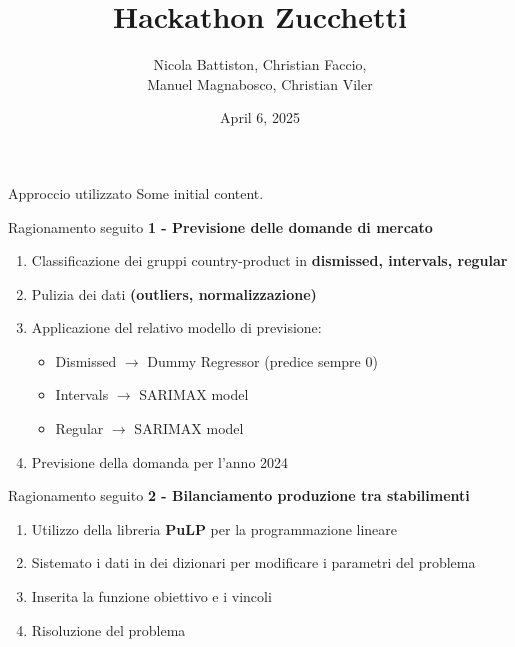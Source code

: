 \documentclass{beamer}
\title{\textbf{Hackathon Zucchetti}}
\author{Nicola Battiston, Christian Faccio, \\ Manuel Magnabosco, Christian Viler}
\date{April 6, 2025}
\begin{document}
\frame{\titlepage}

\begin{frame}{Approccio utilizzato}
    Some initial content.
    
    \pause  %
    
\end{frame}

\begin{frame}{Ragionamento seguito}
    \textbf{1 - Previsione delle domande di mercato}
    \vspace{0.2cm}
    \begin{enumerate}
        \item Classificazione dei gruppi country-product in \textbf{dismissed, intervals, regular}
        \vspace{0.2cm}
        \item Pulizia dei dati \textbf{(outliers, normalizzazione)}
        \vspace{0.2cm}
        \item Applicazione del relativo modello di previsione:
        \begin{itemize}
            \item Dismissed $\to$ Dummy Regressor (predice sempre 0)
            \item Intervals $\to$ SARIMAX model 
            \item Regular $\to$ SARIMAX model
        \end{itemize}
        \vspace{0.2cm}
        \item Previsione della domanda per l'anno 2024
    \end{enumerate}
\end{frame}

\begin{frame}{Ragionamento seguito}
    \textbf{2 - Bilanciamento produzione tra stabilimenti}
    \begin{enumerate}
        \item Utilizzo della libreria \textbf{PuLP} per la programmazione lineare
        \item Sistemato i dati in dei dizionari per modificare i parametri del problema
        \item Inserita la funzione obiettivo e i vincoli
        \item Risoluzione del problema
    \end{enumerate}
\end{frame}
\end{document}
